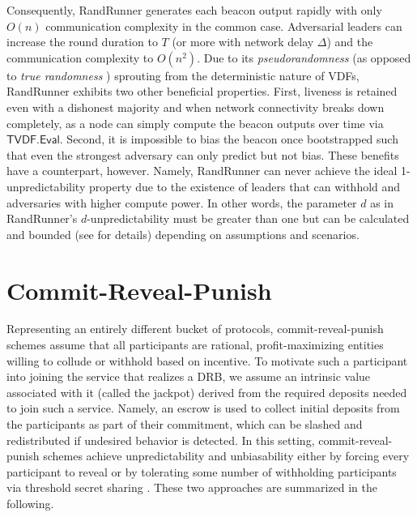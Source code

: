 \documentclass[letterpaper,twocolumn,10pt]{article}
\theoremstyle{definition}
\theoremstyle{remark}
\begin{document}
Consequently, RandRunner generates each beacon output rapidly with only $O(n)$ communication complexity in the common case. Adversarial leaders can increase the round duration to $T$ (or more with network delay $\Delta$) and the communication complexity to $O(n^2)$. Due to its \textit{pseudorandomness} (as opposed to \textit{true randomness} \cite{cascudomt, das2021spurt}) sprouting from the deterministic nature of VDFs, RandRunner exhibits two other beneficial properties. First, liveness is retained even with a dishonest majority and when network connectivity breaks down completely, as a node can simply compute the beacon outputs over time via $\mathsf{TVDF.Eval}$. Second, it is impossible to bias the beacon once bootstrapped such that even the strongest adversary can only predict but not bias. These benefits have a counterpart, however. Namely, RandRunner can never achieve the ideal 1-unpredictability property due to the existence of leaders that can withhold and adversaries with higher compute power. In other words, the parameter $d$ as in RandRunner's $d$-unpredictability must be greater than one but can be calculated and bounded (see \cite{schindler2021randrunner} for details) depending on assumptions and scenarios.

\section{Commit-Reveal-Punish}
\label{section:commit-reveal-punish}
Representing an entirely different bucket of protocols, commit-reveal-punish schemes assume that all participants are rational, profit-maximizing entities willing to collude or withhold based on incentive. To motivate such a participant into joining the service that realizes a DRB, we assume an intrinsic value associated with it (called the jackpot) derived from the required deposits needed to join such a service. Namely, an escrow is used to collect initial deposits from the participants as part of their commitment, which can be slashed and redistributed if undesired behavior is detected. In this setting, commit-reveal-punish schemes achieve unpredictability and unbiasability either by forcing every participant to reveal \cite{youcai2017randao, andrychowicz2014secure, bentov2014use} or by tolerating some number of withholding participants via threshold secret sharing \cite{david2020economically}. These two approaches are summarized in the following.
\end{document}
